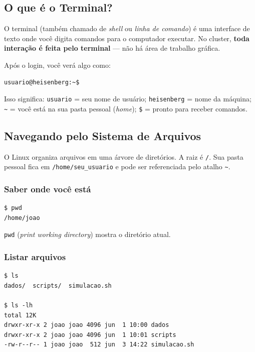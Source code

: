 \documentclass[11pt, a4paper]{article}
\newcommand{\cmd}[1]{\texttt{\textcolor{codeblue}{#1}}}
\begin{document}
\subsection{O que é o Terminal?}

O terminal (também chamado de \textit{shell} ou \textit{linha de comando}) é uma
interface de texto onde você digita comandos para o computador executar. No
cluster, \textbf{toda interação é feita pelo terminal} --- não há área de
trabalho gráfica.

Após o login, você verá algo como:

\begin{lstlisting}[style=terminal]
usuario@heisenberg:~$
\end{lstlisting}

Isso significa: \texttt{usuario} = seu nome de usuário;
\texttt{heisenberg} = nome da máquina; \texttt{\textasciitilde} = você está
na sua pasta pessoal (\textit{home}); \texttt{\$} = pronto para receber comandos.

\subsection{Navegando pelo Sistema de Arquivos}

O Linux organiza arquivos em uma árvore de diretórios. A raiz é \texttt{/}.
Sua pasta pessoal fica em \texttt{/home/seu\_usuario} e pode ser referenciada
pelo atalho \texttt{\textasciitilde}.

\subsubsection{Saber onde você está}

\begin{lstlisting}[style=terminal]
$ pwd
/home/joao
\end{lstlisting}

\cmd{pwd} (\textit{print working directory}) mostra o diretório atual.

\subsubsection{Listar arquivos}

\begin{lstlisting}[style=terminal]
$ ls
dados/  scripts/  simulacao.sh

$ ls -lh
total 12K
drwxr-xr-x 2 joao joao 4096 jun  1 10:00 dados
drwxr-xr-x 2 joao joao 4096 jun  1 10:01 scripts
-rw-r--r-- 1 joao joao  512 jun  3 14:22 simulacao.sh
\end{lstlisting}
\end{document}
